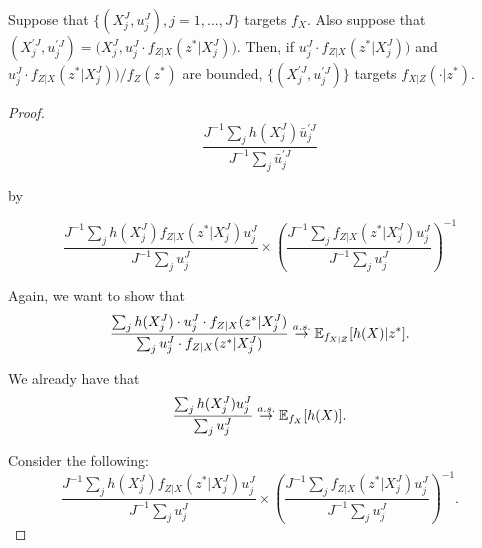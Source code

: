\documentclass{article}
\begin{document}
\begin{lem}
    \label{lem:posterior-proper-weights}
    Suppose that $\{(X_j^J,u_j^J),j=1,\dots,J\}$ targets $f_X$. Also suppose that $(X^{\prime J}_j,u^{\prime J}_j) = \big(X_j^J,u_j^J \cdot f_{Z|X}(z^*|X_j^J)\big)$. Then, if $u_j^J \cdot f_{Z|X}(z^*|X_j^J)\big)$ and $u_j^J \cdot f_{Z|X}(z^*|X_j^J)\big) / f_Z(z^*)$ are bounded, $\{(X^{\prime J}_j,u^{\prime J}_j)\}$ targets $f_{X|Z}(\cdot | z^*)$.
\end{lem}

\begin{proof}

        
    $$ \frac{J^{-1} \sum_j h(X_j^J) \bar{u}_j^{' J}}{J^{-1} \sum_j \bar{u}_j^{' J}}$$
    
    by
    
    \begin{equation}
    \frac{J^{-1} \sum_j h(X_j^J) f_{Z|X}(z^*|X_j^J) {u}_j^{J}}{J^{-1} \sum_j {u}_j^{J}}
    \times \left( \frac{J^{-1} \sum_j f_{Z|X}(z^*|X_j^J) {u}_j^{J}}{J^{-1} \sum_j {u}_j^{J}} \right)^{-1}
    \end{equation}
    

    Again, we want to show that
     $$\frac{\sum_j h(X_j^J) \cdot u_j^J \cdot f_{Z|X}(z^*|X_j^J)}{\sum_j u_j^J \cdot f_{Z|X}(z^*|X_j^J)} \stackrel{a.s.}{\to} \mathbb{E}_{f_{X|Z}}[h(X)|z^*].$$

    We already have that
    $$\frac{\sum_j h(X_j^J)u_j^J}{\sum_j u_j^J} \stackrel{a.s.}{\to} \mathbb{E}_{f_X}[h(X)].$$


    Consider the following:
    \begin{equation}
    \frac{J^{-1} \sum_j h(X_j^J) f_{Z|X}(z^*|X_j^J) {u}_j^{J}}{J^{-1} \sum_j {u}_j^{J}}
    \times \left( \frac{J^{-1} \sum_j f_{Z|X}(z^*|X_j^J) {u}_j^{J}}{J^{-1} \sum_j {u}_j^{J}} \right)^{-1}.
    \end{equation}

    
    

\end{proof}
\end{document}
